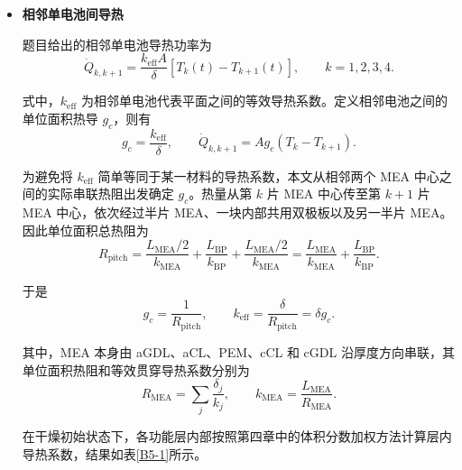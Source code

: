 \documentclass[bwprint]{gmcmthesis}
\numberwithin{equation}{section}
\numberwithin{figure}{section}
\begin{document}
\begin{itemize}
\renewcommand{\labelitemi}{$\blacktriangleright$}
\item \textbf {相邻单电池间导热}

 题目给出的相邻单电池导热功率为
\begin{equation}
\dot{Q}_{k,k+1} = \frac{k_{\text{eff}}A}{\delta} [T_k(t) - T_{k+1}(t)], \qquad k = 1, 2, 3, 4. \label{eq:src:5-5}
\end{equation}

 式中，\(k_{\text{eff}}\) 为相邻单电池代表平面之间的等效导热系数。定义相邻电池之间的单位面积热导 \(g_c\)，则有
\begin{equation}
g_c = \frac{k_{\text{eff}}}{\delta}, \qquad \dot{Q}_{k,k+1} = A g_c (T_k - T_{k+1}). \label{eq:src:5-6}
\end{equation}

 为避免将 \(k_{\text{eff}}\) 简单等同于某一材料的导热系数，本文从相邻两个 MEA 中心之间的实际串联热阻出发确定 \(g_c\)。热量从第 \(k\) 片 MEA 中心传至第 \(k+1\) 片 MEA 中心，依次经过半片 MEA、一块内部共用双极板以及另一半片 MEA。因此单位面积总热阻为
\begin{equation}
R_{\text{pitch}} = \frac{L_{\text{MEA}}/2}{k_{\text{MEA}}} + \frac{L_{\text{BP}}}{k_{\text{BP}}} + \frac{L_{\text{MEA}}/2}{k_{\text{MEA}}} = \frac{L_{\text{MEA}}}{k_{\text{MEA}}} + \frac{L_{\text{BP}}}{k_{\text{BP}}}. \label{eq:src:5-7}
\end{equation}

 于是
\begin{equation}
g_c = \frac{1}{R_{\text{pitch}}}, \qquad k_{\text{eff}} = \frac{\delta}{R_{\text{pitch}}} = \delta g_c. \label{eq:src:5-8}
\end{equation}

 其中，MEA 本身由 aGDL、aCL、PEM、cCL 和 cGDL 沿厚度方向串联，其单位面积热阻和等效贯穿导热系数分别为
\begin{equation}
R_{\text{MEA}} = \sum_j \frac{\delta_j}{k_j}, \qquad k_{\text{MEA}} = \frac{L_{\text{MEA}}}{R_{\text{MEA}}}. \label{eq:src:5-9}
\end{equation}

 在干燥初始状态下，各功能层内部按照第四章中的体积分数加权方法计算层内导热系数，结果如表\ref{B5-1}所示。


\end{itemize}
\end{document}
